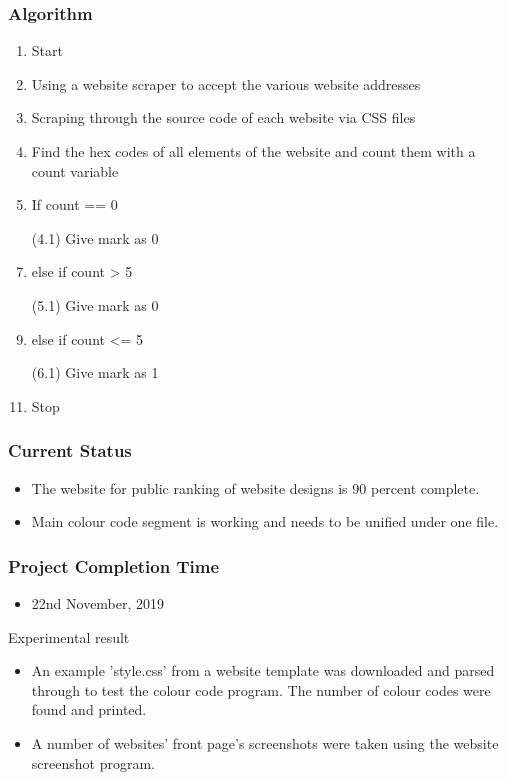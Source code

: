 \documentclass[11pt]{beamer}
\begin{document}
	\begin{frame}
	\frametitle{{Algorithm}}
	\begin{enumerate}
	\item Start
	\item Using a website scraper to accept the various website addresses
	\item Scraping through the source code of each website via CSS files
	\item Find the hex codes of all elements of the website and count them with a count variable
	\item If count == 0
	\item [(4.1)] Give mark as 0
	\item else if count > 5
	\item [(5.1)] Give mark as 0
	\item else if count <= 5
	\item [(6.1)] Give mark as 1
	\item Stop
	\end{enumerate}
	
	\end{frame}
	\begin{frame}
	\frametitle{{Current Status}}
		\begin{itemize}
		\item The website for public ranking of website designs is 90 percent complete.
		\item Main colour code segment is working and needs to be unified under one file.
	\end{itemize}
	\end{frame}
\begin{frame}
			\frametitle{{Project Completion Time}}
	\begin{itemize}
		\item 22nd November, 2019
	\end{itemize}
\end{frame}

\begin{frame}{Experimental result}
			\begin{itemize}
				\item An example 'style.css' from a website template was downloaded and parsed through to test the colour code program. The number of colour codes were found and printed.
				\item A number of websites' front page's screenshots were taken using the website screenshot program. 
			\end{itemize}	
	\end{frame}
\end{document}
